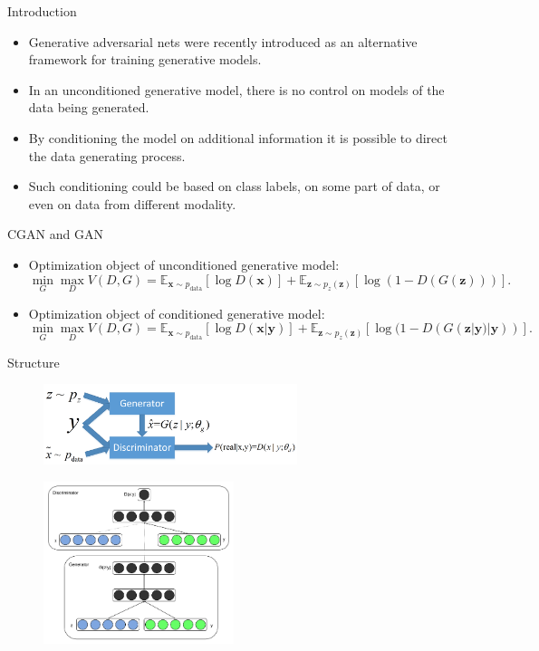 \documentclass[10pt]{beamer}
\begin{document}
	\begin{frame}{Introduction}
		\begin{itemize}
			\item Generative adversarial nets were recently introduced as an alternative framework for training generative models.
			\pause
			\item In an unconditioned generative model, there is no control on models of the data being generated.
			\pause
			\item By conditioning the model on additional information it is possible to direct the data generating process.
			\pause
			\item Such conditioning could be based on class labels, on some part of data, or even on data from different modality.
		\end{itemize}
	\end{frame}

	\begin{frame}{CGAN and GAN}
		\begin{itemize}
			\pause
			\item Optimization object of unconditioned generative model:
			\pause
			$$
			\mathop{\min}_{G}\mathop{\max}_{D}V(D,G)=\mathbb{E}_{\bm{x}\sim p_{\text{data}}}\left[\log D(\bm{x})\right]+\mathbb{E}_{\bm{z}\sim p_z(\bm{z})}\left[\log(1-D(G(\bm{z})))\right].
			$$
			\pause
			\item Optimization object of conditioned generative model:
			\pause
			$$
			\mathop{\min}_{G}\mathop{\max}_{D}V(D,G)=\mathbb{E}_{\bm{x}\sim p_{\text{data}}}\left[\log D(\bm{x}|\bm{y})\right]+\mathbb{E}_{\bm{z}\sim p_z(\bm{z})}\left[\log(1-D(G(\bm{z}|\bm{y})|\bm{y}))\right].
			$$
		\end{itemize}
	\end{frame}

	\begin{frame}{Structure}
		\begin{figure}
			\includegraphics[width=20em]{figures/CGAN-general-structure.png}
		\end{figure}
		\begin{figure}
			\includegraphics[width=15em]{figures/CGAN-origin-structure.png}
		\end{figure}
	\end{frame}
\end{document}
